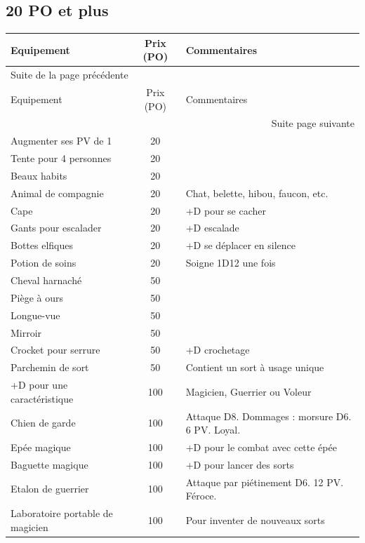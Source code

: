 \documentclass[a4paper, 11pt, twoside]{article}
\begin{document}
\subsection{20 PO et plus}
\label{sec:org0b98bca}

\begin{longtable}{l|c|p{10cm}}
Equipement & Prix (PO) & Commentaires\\
\hline
\endfirsthead
\multicolumn{3}{l}{Suite de la page précédente} \\
\hline

Equipement & Prix (PO) & Commentaires \\

\hline
\endhead
\hline\multicolumn{3}{r}{Suite page suivante} \\
\endfoot
\endlastfoot
\hline
Augmenter ses PV de 1 & 20 & \\
Tente pour 4 personnes & 20 & \\
Beaux habits & 20 & \\
Animal de compagnie & 20 & Chat, belette, hibou, faucon, etc.\\
Cape & 20 & +D pour se cacher\\
Gants pour escalader & 20 & +D escalade\\
Bottes elfiques & 20 & +D se déplacer en silence\\
Potion de soins & 20 & Soigne 1D12 une fois\\
Cheval harnaché & 50 & \\
Piège à ours & 50 & \\
Longue-vue & 50 & \\
Mirroir & 50 & \\
Crocket pour serrure & 50 & +D crochetage\\
Parchemin de sort & 50 & Contient un sort à usage unique\\
+D pour une caractéristique & 100 & Magicien, Guerrier ou Voleur\\
Chien de garde & 100 & Attaque D8. Dommages : morsure D6. 6 PV. Loyal.\\
Epée magique & 100 & +D pour le combat avec cette épée\\
Baguette magique & 100 & +D pour lancer des sorts\\
Etalon de guerrier & 100 & Attaque par piétinement D6. 12 PV. Féroce.\\
Laboratoire portable de magicien & 100 & Pour inventer de nouveaux sorts\\
\end{longtable}
\end{document}
